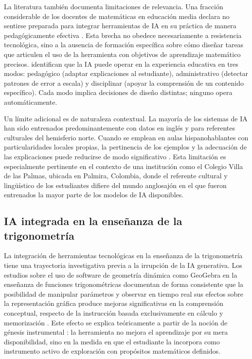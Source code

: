 La literatura también documenta limitaciones de relevancia. Una fracción considerable de los docentes de matemáticas en educación media declara no sentirse preparada para integrar herramientas de IA en su práctica de manera pedagógicamente efectiva \parencite{alsharidahTeachersPerceptionsUsing2024}. Esta brecha no obedece necesariamente a resistencia tecnológica, sino a la ausencia de formación específica sobre cómo diseñar tareas que articulen el uso de la herramienta con objetivos de aprendizaje matemático precisos. \textcite{cromptonAffordancesChallengesArtificial2022} identifican que la IA puede operar en la experiencia educativa en tres modos: pedagógico (adaptar explicaciones al estudiante), administrativo (detectar patrones de error a escala) y disciplinar (apoyar la comprensión de un contenido específico). Cada modo implica decisiones de diseño distintas; ninguno opera automáticamente.

Un límite adicional es de naturaleza contextual. La mayoría de los sistemas de IA han sido entrenados predominantemente con datos en inglés y para referentes culturales del hemisferio norte. Cuando se emplean en aulas hispanohablantes con particularidades locales propias, la pertinencia de los ejemplos y la adecuación de las explicaciones puede reducirse de modo significativo \parencite{pepinMathematicsEducationEra2025}. Esta limitación es especialmente pertinente en el contexto de una institución como el Colegio Villa de las Palmas, ubicada en Palmira, Colombia, donde el referente cultural y lingüístico de los estudiantes difiere del mundo anglosajón en el que fueron entrenados la mayor parte de los modelos de IA disponibles.

\subsection{IA integrada en la enseñanza de la trigonometría}

La integración de herramientas tecnológicas en la enseñanza de la trigonometría tiene una trayectoria investigativa previa a la irrupción de la IA generativa. Los estudios sobre el uso de software de geometría dinámica como GeoGebra en la enseñanza de funciones trigonométricas documentan de forma consistente que la posibilidad de manipular parámetros y observar en tiempo real sus efectos sobre la representación gráfica produce mejoras significativas en la comprensión conceptual, respecto de la instrucción basada exclusivamente en cálculo y memorización \parencite{zenginEffectDynamicMathematics2012}. Este efecto se explica teóricamente a partir de la noción de génesis instrumental \parencite{troucheManagingComplexityHuman2004}: la herramienta no mejora el aprendizaje por su mera disponibilidad, sino en la medida en que el estudiante la incorpora como instrumento activo de exploración con propósitos matemáticos definidos.

